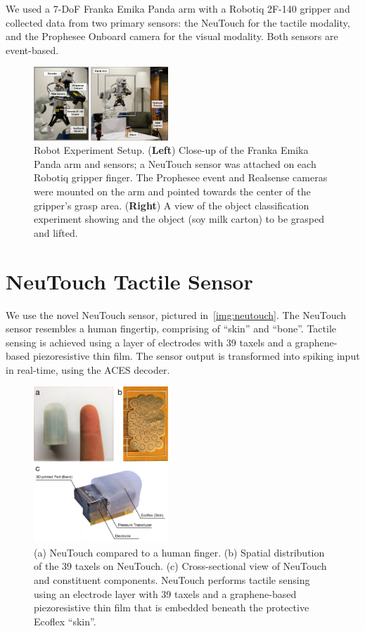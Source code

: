 \documentclass[fyp]{socreport}
\begin{document}
We used a 7-DoF Franka Emika Panda arm with a Robotiq 2F-140 gripper and
collected data from two primary sensors: the NeuTouch for the tactile modality,
and the Prophesee Onboard camera for the visual modality. Both sensors are
event-based.

\begin{figure}
  \centering
  \includegraphics[width=0.45\textwidth]{images/robotsetup/robot_setup_wsensors.pdf}
  \caption{Robot Experiment Setup. (\textbf{Left}) Close-up of the Franka Emika
    Panda arm and sensors; a NeuTouch sensor was attached on each Robotiq
    gripper finger. The Prophesee event and Realsense cameras were mounted on
    the arm and pointed towards the center of the gripper's grasp area.
    (\textbf{Right}) A view of the object classification experiment showing and
    the object (soy milk carton) to be grasped and
    lifted.\label{fig:robotsetup}}
\end{figure}

\section{NeuTouch Tactile Sensor}
We use the novel NeuTouch sensor, pictured in~\autoref{img:neutouch}. The
NeuTouch sensor resembles a human fingertip, comprising of ``skin'' and
``bone''. Tactile sensing is achieved using a layer of electrodes with 39 taxels
and a graphene-based piezoresistive thin film. The sensor output is transformed
into spiking input in real-time, using the ACES decoder.

\begin{figure}
\centering
\includegraphics[width=0.45\textwidth]{images/spktac}
\caption{(a) NeuTouch compared to a human finger. (b) Spatial distribution of
  the 39 taxels on NeuTouch. (c) Cross-sectional view of NeuTouch and
  constituent components. NeuTouch performs tactile sensing using an electrode
  layer with 39 taxels and a graphene-based piezoresistive thin film that is
  embedded beneath the protective Ecoflex ``skin''.\label{img:neutouch}}
\end{figure}
\end{document}

